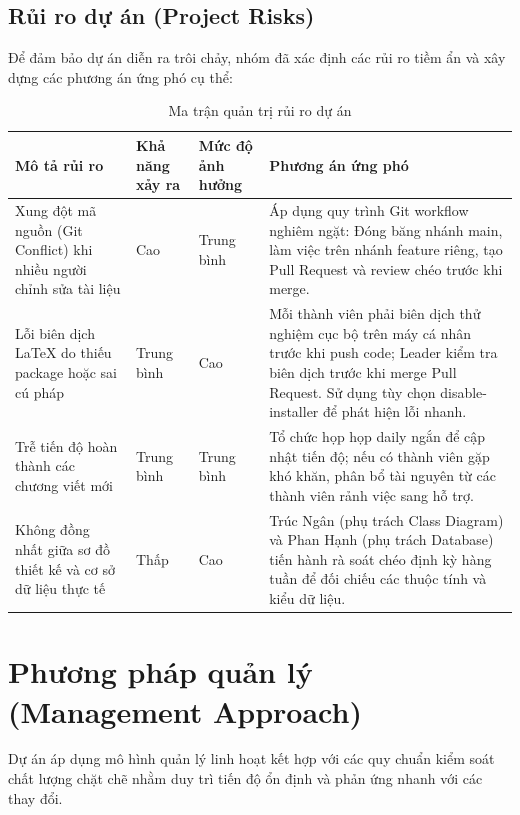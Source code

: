 \subsection{Rủi ro dự án (Project Risks)}
\label{subsec:spmp_risks}

Để đảm bảo dự án diễn ra trôi chảy, nhóm đã xác định các rủi ro tiềm ẩn và xây dựng các phương án ứng phó cụ thể:

\begin{table}[H]
\centering
\renewcommand{\arraystretch}{1.3}
\begin{tabularx}{\textwidth}{|>{\raggedright\arraybackslash}p{3.2cm}|>{\centering\arraybackslash}p{2.2cm}|>{\centering\arraybackslash}p{2.2cm}|>{\raggedright\arraybackslash}X|}
\hline
\rowcolor{tableheader}
\textbf{Mô tả rủi ro} & \textbf{Khả năng xảy ra} & \textbf{Mức độ ảnh hưởng} & \textbf{Phương án ứng phó} \\ \hline
Xung đột mã nguồn (Git Conflict) khi nhiều người chỉnh sửa tài liệu & Cao & Trung bình & Áp dụng quy trình Git workflow nghiêm ngặt: Đóng băng nhánh main, làm việc trên nhánh feature riêng, tạo Pull Request và review chéo trước khi merge. \\ \hline
Lỗi biên dịch LaTeX do thiếu package hoặc sai cú pháp & Trung bình & Cao & Mỗi thành viên phải biên dịch thử nghiệm cục bộ trên máy cá nhân trước khi push code; Leader kiểm tra biên dịch trước khi merge Pull Request. Sử dụng tùy chọn disable-installer để phát hiện lỗi nhanh. \\ \hline
Trễ tiến độ hoàn thành các chương viết mới & Trung bình & Trung bình & Tổ chức họp họp daily ngắn để cập nhật tiến độ; nếu có thành viên gặp khó khăn, phân bổ tài nguyên từ các thành viên rảnh việc sang hỗ trợ. \\ \hline
Không đồng nhất giữa sơ đồ thiết kế và cơ sở dữ liệu thực tế & Thấp & Cao & Trúc Ngân (phụ trách Class Diagram) và Phan Hạnh (phụ trách Database) tiến hành rà soát chéo định kỳ hàng tuần để đối chiếu các thuộc tính và kiểu dữ liệu. \\ \hline
\end{tabularx}
\caption{Ma trận quản trị rủi ro dự án}
\label{tab:spmp_risks}
\end{table}

\section{Phương pháp quản lý (Management Approach)}
\label{sec:spmp_management_approach}

Dự án áp dụng mô hình quản lý linh hoạt kết hợp với các quy chuẩn kiểm soát chất lượng chặt chẽ nhằm duy trì tiến độ ổn định và phản ứng nhanh với các thay đổi.

